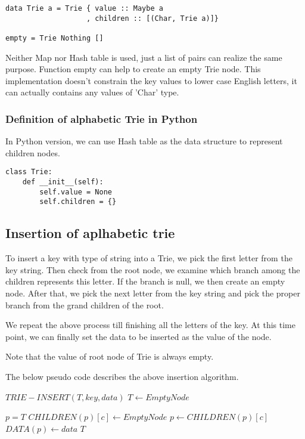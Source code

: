 \documentclass{article}
\begin{document}
\lstset{language=Haskell}
\begin{lstlisting}
data Trie a = Trie { value :: Maybe a
                   , children :: [(Char, Trie a)]}

empty = Trie Nothing []
\end{lstlisting}

Neither Map nor Hash table is used, just a list of pairs can realize
the same purpose. Function empty can help to create an empty Trie
node. This implementation doesn't constrain the key values to lower
case English letters, it can actually contains any values of 'Char' type.

\subsubsection*{Definition of alphabetic Trie in Python}
In Python version, we can use Hash table as the data structure to
represent children nodes.

\lstset{language=Python}
\begin{lstlisting}
class Trie:
    def __init__(self):
        self.value = None
        self.children = {}
\end{lstlisting}

\subsection{Insertion of aplhabetic trie}
To insert a key with type of string into a Trie, we pick the first letter
from the key string. Then check from the root node, we examine which branch
among the children represents this letter. If the branch is null, we then
create an empty node. After that, we pick the next letter from the key string
and pick the proper branch from the grand children of the root.

We repeat the above process till finishing all the letters of the key. 
At this time point, we can finally set the data to be inserted as the value 
of the node.

Note that the value of root node of Trie is always empty.

The below pseudo code describes the above insertion algorithm.

\begin{algorithmic}
\STATE $TRIE-INSERT(T, key, data)$
   \STATE $T \leftarrow EmptyNode$ \ENDIF

  \STATE $p=T$
      \STATE $CHILDREN(p)[c] \leftarrow EmptyNode$
    \ENDIF
    \STATE $p \leftarrow CHILDREN(p)[c]$
  \ENDFOR
  \STATE $DATA(p) \leftarrow data$
  \RETURN $T$
\end{algorithmic}
\end{document}
